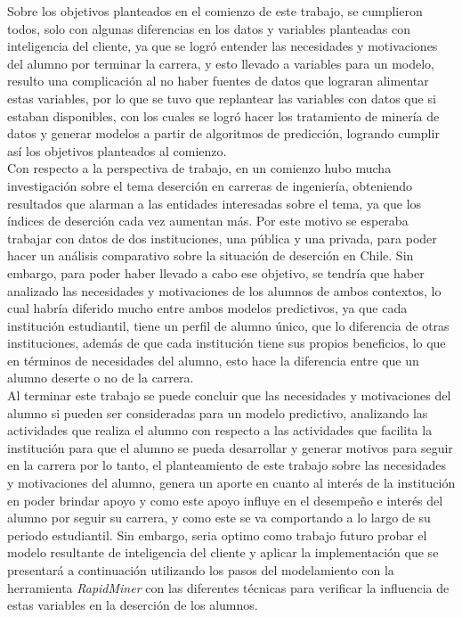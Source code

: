 Sobre los objetivos planteados en el comienzo de este trabajo, se cumplieron todos, solo con algunas diferencias en los datos y variables planteadas con inteligencia del cliente, ya que se logró entender las necesidades y motivaciones del alumno por terminar la carrera, y esto llevado a variables para un modelo, resulto una complicación al no haber fuentes de datos que lograran alimentar estas variables, por lo que se tuvo que replantear las variables con datos que si estaban disponibles, con los cuales se logró hacer los tratamiento de minería de datos y generar modelos a partir de algoritmos de predicción, logrando cumplir así los objetivos planteados al comienzo.\\

Con respecto a la perspectiva de trabajo, en un comienzo hubo mucha investigación sobre el tema deserción en carreras de ingeniería, obteniendo resultados que alarman a las entidades interesadas sobre el tema, ya que los índices de deserción cada vez aumentan más. Por este motivo se esperaba trabajar con datos de dos instituciones, una pública y una privada, para poder hacer un análisis comparativo sobre la situación de deserción en Chile. Sin embargo, para poder haber llevado a cabo ese objetivo, se tendría que haber analizado las necesidades y motivaciones de los alumnos de ambos contextos, lo cual habría diferido mucho entre ambos modelos predictivos, ya que cada institución estudiantil, tiene un perfil de alumno único, que lo diferencia de otras instituciones, además de que cada institución tiene sus propios beneficios, lo que en términos de necesidades del alumno, esto hace la diferencia entre que un alumno deserte o no de la carrera.\\

Al terminar este trabajo se puede concluir que las necesidades y motivaciones del alumno si pueden ser consideradas para un modelo predictivo, analizando las actividades que realiza el alumno con respecto a las actividades que facilita la institución para que el alumno se pueda desarrollar y generar motivos para seguir en la carrera por lo tanto, el planteamiento de este trabajo sobre las necesidades y motivaciones del alumno, genera un aporte en cuanto al interés de la institución en poder brindar apoyo y como este apoyo influye en el desempeño e interés del alumno por seguir su carrera, y como este se va comportando a lo largo de su periodo estudiantil. Sin embargo, seria optimo como trabajo futuro probar el modelo resultante de inteligencia del cliente y aplicar la implementación que se presentará a continuación utilizando los pasos del modelamiento con la herramienta \textit{RapidMiner} con las diferentes técnicas para verificar la influencia de estas variables en la deserción de los alumnos.\\

